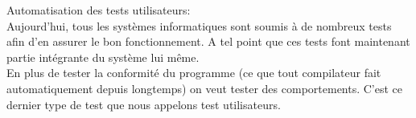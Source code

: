 \documentclass[10pt]{}
\begin{document}
Automatisation des tests utilisateurs:\\

Aujourd'hui, tous les systèmes informatiques sont soumis à de nombreux tests afin d'en assurer le bon fonctionnement. A tel point que ces tests font maintenant partie intégrante du système lui même.\\
En plus de tester la conformité du programme (ce que tout compilateur fait automatiquement depuis longtemps) on veut tester des comportements. C'est ce dernier type de test que nous appelons test utilisateurs.\\
\end{document}
